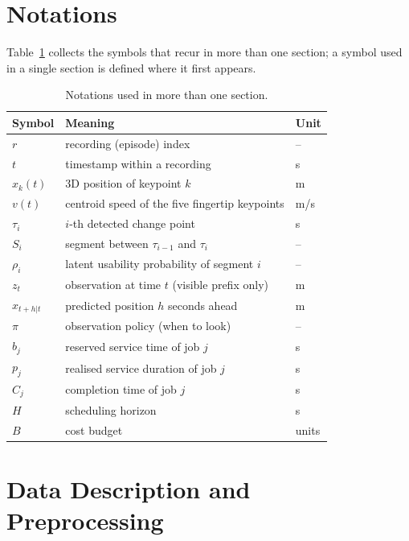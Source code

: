 \documentclass{swmcmthesis}
\begin{document}
\section{Notations}
Table~\ref{tab:notation} collects the symbols that recur in more than one section; a symbol used in a single section is defined where it first appears.
\begin{table}[tbp]\centering\footnotesize\caption{Notations used in more than one section.}\label{tab:notation}
\begin{tabular}{@{}lll@{}}\toprule Symbol & Meaning & Unit \\ \midrule
$r$ & recording (episode) index & -- \\
$t$ & timestamp within a recording & s \\
$x_k(t)$ & 3D position of keypoint $k$ & m \\
$v(t)$ & centroid speed of the five fingertip keypoints & m/s \\
$\tau_i$ & $i$-th detected change point & s \\
$S_i$ & segment between $\tau_{i-1}$ and $\tau_i$ & -- \\
$\rho_i$ & latent usability probability of segment $i$ & -- \\
$z_t$ & observation at time $t$ (visible prefix only) & m \\
$\hat{x}_{t+h|t}$ & predicted position $h$ seconds ahead & m \\
$\pi$ & observation policy (when to look) & -- \\
$b_j$ & reserved service time of job $j$ & s \\
$p_j$ & realised service duration of job $j$ & s \\
$C_j$ & completion time of job $j$ & s \\
$H$ & scheduling horizon & s \\
$B$ & cost budget & units \\ \bottomrule\end{tabular}\end{table}

\section{Data Description and Preprocessing}
\end{document}
